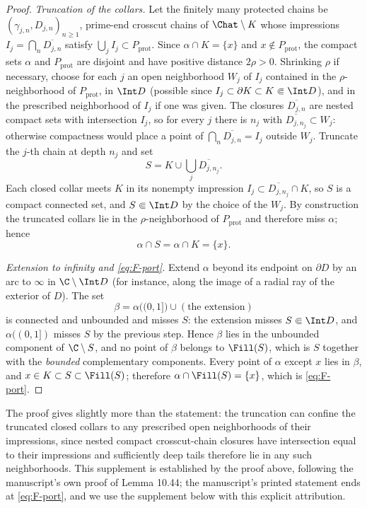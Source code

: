 \begin{proof}
\emph{Truncation of the collars.}
Let the finitely many protected chains be
$(\gamma_{j,n},D_{j,n})_{n\ge1}$, prime-end crosscut chains of
$\Chat\setminus K$ whose impressions
$I_j=\bigcap_n\overline{D_{j,n}}$ satisfy
$\bigcup_jI_j\subset P_{\mathrm{prot}}$.  Since $\alpha\cap K=\{x\}$ and
$x\notin P_{\mathrm{prot}}$, the compact sets $\alpha$ and
$P_{\mathrm{prot}}$ are disjoint and have positive distance $2\rho>0$.
Shrinking $\rho$ if necessary, choose for each $j$ an open neighborhood
$W_j$ of $I_j$ contained in the $\rho$-neighborhood of
$P_{\mathrm{prot}}$, in $\Int D$ (possible since
$I_j\subset\partial K\subset K\Subset\Int D$), and in the prescribed
neighborhood of $I_j$ if one was given.  The closures
$\overline{D_{j,n}}$ are nested compact sets with intersection $I_j$, so
for every $j$ there is $n_j$ with
$\overline{D_{j,n_j}}\subset W_j$: otherwise compactness would place a
point of $\bigcap_n\overline{D_{j,n}}=I_j$ outside $W_j$.  Truncate the
$j$-th chain at depth $n_j$ and set
\[
S=K\cup\bigcup_j\overline{D_{j,n_j}} .
\]
Each closed collar meets $K$ in its nonempty impression
$I_j\subset\overline{D_{j,n_j}}\cap K$, so $S$ is a compact connected
set, and $S\Subset\Int D$ by the choice of the $W_j$.  By construction
the truncated collars lie in the $\rho$-neighborhood of
$P_{\mathrm{prot}}$ and therefore miss $\alpha$; hence
\[
\alpha\cap S=\alpha\cap K=\{x\}.
\]

\emph{Extension to infinity and \eqref{eq:F-port}.}
Extend $\alpha$ beyond its endpoint on $\partial D$ by an arc to
$\infty$ in $\C\setminus\Int D$ (for instance, along the image of a
radial ray of the exterior of $D$).  The set
\[
\beta=\alpha\bigl((0,1]\bigr)\cup(\text{the extension})
\]
is connected and unbounded and misses $S$: the extension misses
$S\Subset\Int D$, and $\alpha((0,1])$ misses $S$ by the previous step.
Hence $\beta$ lies in the unbounded component of $\C\setminus S$, and no
point of $\beta$ belongs to $\Fill(S)$, which is $S$ together with the
\emph{bounded} complementary components.  Every point of $\alpha$ except
$x$ lies in $\beta$, and $x\in K\subset S\subset\Fill(S)$; therefore
$\alpha\cap\Fill(S)=\{x\}$, which is \eqref{eq:F-port}.
\end{proof}

\begin{remark}\label{rem:F-collar-confinement}
The proof gives slightly more than the statement: the truncation can
confine the truncated closed collars to any prescribed open
neighborhoods of their impressions, since nested compact crosscut-chain
closures have intersection equal to their impressions and sufficiently
deep tails therefore lie in any such neighborhoods.  This supplement is
established by the proof above, following the manuscript's own proof of
Lemma 10.44; the manuscript's printed statement ends at
\eqref{eq:F-port}, and we use the supplement below with this explicit
attribution.
\end{remark}

